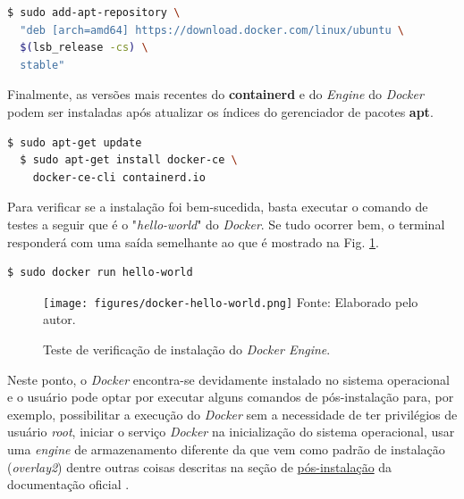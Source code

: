 \documentclass[
  12pt,				%
  openright,			%
  twoside,			%
  a4paper,			%
  english,			%
  french,				%
  spanish,			%
  brazil,				%
  ]{abntex2}
\begin{document}
\begin{adjustbox}{max width=\linewidth}
  \begin{lstlisting}[language=bash]
  $ sudo add-apt-repository \
  "deb [arch=amd64] https://download.docker.com/linux/ubuntu \
  $(lsb_release -cs) \
  stable"
\end{lstlisting}
\end{adjustbox}


Finalmente, as versões mais recentes do \textbf{containerd} e do \textit{Engine} do \textit{Docker} podem ser instaladas após atualizar os índices do
gerenciador de pacotes \textbf{apt}.

\begin{adjustbox}{max width=\linewidth}
  \begin{lstlisting}[language=bash]
  $ sudo apt-get update
  $ sudo apt-get install docker-ce \
    docker-ce-cli containerd.io
\end{lstlisting}
\end{adjustbox}

Para verificar se a instalação foi bem-sucedida, basta executar o comando de testes a seguir que é o "\textit{hello-world}" do \textit{Docker}. Se tudo ocorrer bem,
o terminal responderá com uma saída semelhante ao que é mostrado na Fig. \ref{fig:docker-hello-world}.

\begin{adjustbox}{max width=\linewidth}
  \begin{lstlisting}[language=bash]
  $ sudo docker run hello-world
\end{lstlisting}
\end{adjustbox}

\begin{figure}[!htb]
  \centering
  \caption{Teste de verificação de instalação do \textit{Docker Engine}.}
  \texttt{[image: figures/docker-hello-world.png]}
  Fonte: Elaborado pelo autor.
  \label{fig:docker-hello-world}
\end{figure}

Neste ponto, o \textit{Docker} encontra-se devidamente instalado no sistema operacional e o usuário pode optar por executar alguns comandos de pós-instalação
para, por exemplo, possibilitar a execução do \textit{Docker} sem a necessidade de ter privilégios de usuário \textit{root}, iniciar o serviço \textit{Docker} na inicialização do
sistema operacional, usar uma \textit{engine} de armazenamento diferente da que vem como padrão de instalação (\textit{overlay2}) dentre outras coisas descritas
na seção de \href{https://docs.docker.com/engine/install/linux-postinstall/}{pós-instalação} da documentação oficial \cite{Docker:post-installation-2020}.
\end{document}
